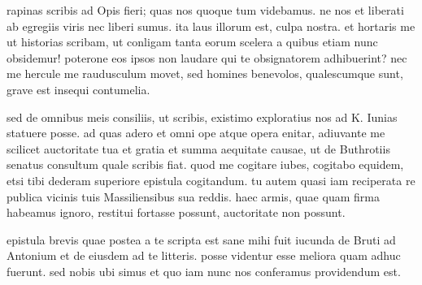  rapinas scribis ad Opis fieri; quas nos quoque tum videbamus. ne nos et liberati ab egregiis viris nec liberi sumus. ita laus illorum est, culpa nostra. et hortaris me ut historias scribam, ut conligam tanta eorum scelera a quibus etiam nunc obsidemur! poterone eos ipsos non laudare qui te obsignatorem adhibuerint? nec me hercule me raudusculum movet, sed homines benevolos, qualescumque sunt, grave est insequi contumelia.

 sed de omnibus meis consiliis, ut scribis, existimo exploratius nos ad K. Iunias statuere posse. ad quas adero et omni ope atque opera enitar, adiuvante me scilicet auctoritate tua et gratia et summa aequitate causae, ut de Buthrotiis senatus consultum quale scribis fiat. quod me cogitare iubes, cogitabo equidem, etsi tibi dederam superiore epistula cogitandum. tu autem quasi iam reciperata re publica vicinis tuis Massiliensibus sua reddis. haec armis, quae quam firma habeamus ignoro, restitui fortasse possunt, auctoritate non possunt.

 epistula brevis quae postea a te scripta est sane mihi fuit iucunda de Bruti ad Antonium et de eiusdem ad te litteris. posse videntur esse meliora quam adhuc fuerunt. sed nobis ubi simus et quo iam nunc nos conferamus providendum est.
